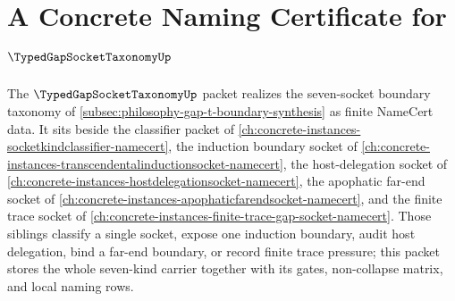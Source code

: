 \chapter{A Concrete Naming Certificate for $\TypedGapSocketTaxonomyUp$}
\label{ch:concrete-instances-typedgapsockettaxonomy-namecert}

The $\TypedGapSocketTaxonomyUp$ packet realizes the seven-socket boundary taxonomy of \autoref{subsec:philosophy-gap-t-boundary-synthesis} as finite NameCert data. It sits beside the classifier packet of \autoref{ch:concrete-instances-socketkindclassifier-namecert}, the induction boundary socket of \autoref{ch:concrete-instances-transcendentalinductionsocket-namecert}, the host-delegation socket of \autoref{ch:concrete-instances-hostdelegationsocket-namecert}, the apophatic far-end socket of \autoref{ch:concrete-instances-apophaticfarendsocket-namecert}, and the finite trace socket of \autoref{ch:concrete-instances-finite-trace-gap-socket-namecert}. Those siblings classify a single socket, expose one induction boundary, audit host delegation, bind a far-end boundary, or record finite trace pressure; this packet stores the whole seven-kind carrier together with its gates, non-collapse matrix, and local naming rows.



